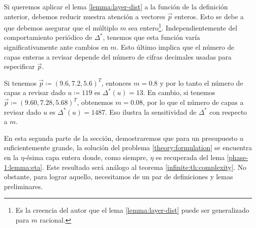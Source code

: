 Si queremos aplicar el lema \ref{lemma:layer-dist} a la función de la definición anterior, debemos
reducir nuestra atención a vectores $\vec{p}$ enteros. Esto se debe a que debemos asegurar que el
múltiplo $m$ sea entero\footnote{
	Es la creencia del autor que el lema \ref{lemma:layer-dist} puede ser generalizado para
	$m$ racional.
}. Independientemente del comportamiento
periódico de $\Delta^*$, tenemos que esta función varía significativamente ante cambios en $m$.
Esto último implica que el número de capas enteras a revisar depende del número de cifras decimales
usadas para especificar $\vec{p}$.

\begin{example}
	\label{ex:decimals}
	Si tenemos $\vec{p} \coloneq (9.6, 7.2, 5.6)^T$, entonces $m = 0.8$ y por lo tanto el número de
	capas a revisar dado $u \coloneq 119$ es $\Delta^*(u) = 13$. En cambio, si tenemos $\vec{p} \coloneq
	(9.60, 7.28, 5.68)^T$, obtenemos $m = 0.08$, por lo que el número de capas a revisar dado $u$ es
	$\Delta^*(u) = 1487$. Eso ilustra la sensitividad de $\Delta^*$ con respecto a $m$.
\end{example}

% 
% 


En esta segunda parte de la sección, demostraremos que para un presupuesto $u$ suficientemente
grande, la solución del problema \eqref{theory:formulation} se encuentra en la $\eta$-ésima capa
entera donde, como siempre, $\eta$ es recuperada del lema \ref{phase-1:lemma:eta}. Este resultado
será análogo al teorema \ref{infinite:th:complexity}. No obstante, para lograr aquello, necesitamos
de un par de definiciones y lemas preliminares.

